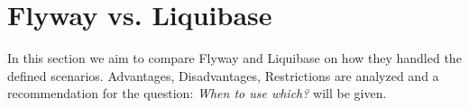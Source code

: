 

\chapter{Flyway vs. Liquibase}
%
In this section we aim to compare Flyway and Liquibase on how they handled the defined scenarios.
Advantages, Disadvantages, Restrictions are analyzed and a recommendation for the question: \textit{When to use which?} will be given.


\newpage